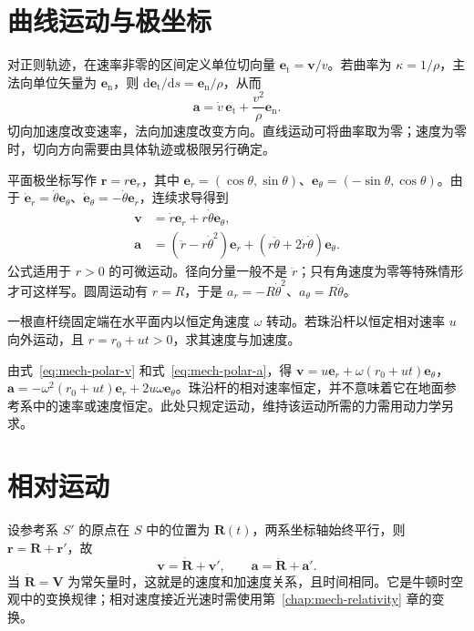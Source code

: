 \documentclass[UTF8,12pt,a4paper,fontset=fandol]{ctexbook}
\begin{document}
\section{曲线运动与极坐标}
对正则轨迹，在速率非零的区间定义单位切向量 $\mathbf e_{\mathrm t}=\mathbf v/v$。若曲率为 $\kappa=1/\rho$，主法向单位矢量为 $\mathbf e_{\mathrm n}$，则 $\mathrm d\mathbf e_{\mathrm t}/\mathrm ds=\mathbf e_{\mathrm n}/\rho$，从而
\begin{equation}
 \mathbf a=\dot v\,\mathbf e_{\mathrm t}+\frac{v^2}{\rho}\mathbf e_{\mathrm n}.
 \label{eq:mech-tangent-normal}
\end{equation}
切向加速度改变速率，法向加速度改变方向。直线运动可将曲率取为零；速度为零时，切向方向需要由具体轨迹或极限另行确定。

平面极坐标写作 $\mathbf r=r\mathbf e_r$，其中 $\mathbf e_r=(\cos\theta,\sin\theta)$、$\mathbf e_\theta=(-\sin\theta,\cos\theta)$。由于 $\dot{\mathbf e}_r=\dot\theta\mathbf e_\theta$、$\dot{\mathbf e}_\theta=-\dot\theta\mathbf e_r$，连续求导得到
\begin{align}
 \mathbf v&=\dot r\mathbf e_r+r\dot\theta\mathbf e_\theta,\label{eq:mech-polar-v}\\
 \mathbf a&=(\ddot r-r\dot\theta^2)\mathbf e_r+(r\ddot\theta+2\dot r\dot\theta)\mathbf e_\theta.
 \label{eq:mech-polar-a}
\end{align}
公式适用于 $r>0$ 的可微运动。径向分量一般不是 $\ddot r$；只有角速度为零等特殊情形才可这样写。圆周运动有 $r=R$，于是 $a_r=-R\dot\theta^2$、$a_\theta=R\ddot\theta$。

\begin{example}[匀速转动杆上的滑珠运动学]
一根直杆绕固定端在水平面内以恒定角速度 $\omega$ 转动。若珠沿杆以恒定相对速率 $u$ 向外运动，且 $r=r_0+ut>0$，求其速度与加速度。
\end{example}
\begin{solve}
由式~\eqref{eq:mech-polar-v} 和式~\eqref{eq:mech-polar-a}，得 $\mathbf v=u\mathbf e_r+\omega(r_0+ut)\mathbf e_\theta$，$\mathbf a=-\omega^2(r_0+ut)\mathbf e_r+2u\omega\mathbf e_\theta$。珠沿杆的相对速率恒定，并不意味着它在地面参考系中的速率或速度恒定。此处只规定运动，维持该运动所需的力需用动力学另求。
\end{solve}

\section{相对运动}
设参考系 $S'$ 的原点在 $S$ 中的位置为 $\mathbf R(t)$，两系坐标轴始终平行，则 $\mathbf r=\mathbf R+\mathbf r'$，故
\[
 \mathbf v=\dot{\mathbf R}+\mathbf v',\qquad \mathbf a=\ddot{\mathbf R}+\mathbf a'.
\]
当 $\dot{\mathbf R}=\mathbf V$ 为常矢量时，这就是的速度和加速度关系，且时间相同。它是牛顿时空观中的变换规律；相对速度接近光速时需使用第~\ref{chap:mech-relativity} 章的变换。
\end{document}
